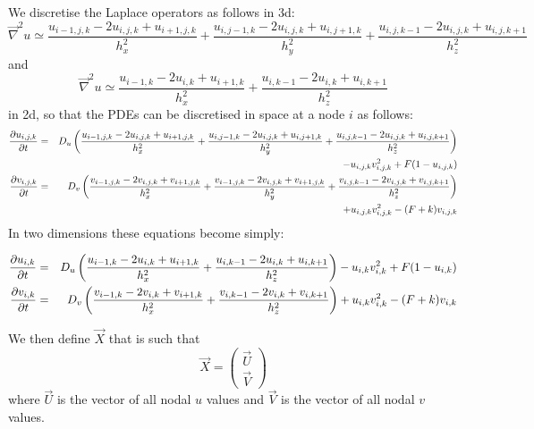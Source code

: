 We discretise the Laplace operators as follows in 3d:
\[
\vec\nabla^2 u \simeq 
\frac{u_{i-1,j,k}-2u_{i,j,k}+u_{i+1,j,k}}{h_x^2} + 
\frac{u_{i,j-1,k}-2u_{i,j,k}+u_{i,j+1,k}}{h_y^2} + 
\frac{u_{i,j,k-1}-2u_{i,j,k}+u_{i,j,k+1}}{h_z^2} 
\]
and
\[
\vec\nabla^2 u \simeq 
\frac{u_{i-1,k}-2u_{i,k}+u_{i+1,k}}{h_x^2} + 
\frac{u_{i,k-1}-2u_{i,k}+u_{i,k+1}}{h_z^2} 
\]
in 2d, so that the PDEs can be discretised in space at a node $i$ as follows:
\begin{eqnarray}
\frac{\partial u_{i,j,k}}{\partial t} 
&=& D_u 
\left(
\frac{u_{i-1,j,k}-2u_{i,j,k}+u_{i+1,j,k}}{h_x^2} + 
\frac{u_{i,j-1,k}-2u_{i,j,k}+u_{i,j+1,k}}{h_y^2} + 
\frac{u_{i,j,k-1}-2u_{i,j,k}+u_{i,j,k+1}}{h_z^2} 
\right) \nonumber\\
&&- u_{i,j,k}v_{i,j,k}^2 + F(1-u_{i,j,k}) 
\nonumber\\
\frac{\partial v_{i,j,k}}{\partial t} &=& D_v 
\left(
\frac{v_{i-1,j,k}-2v_{i,j,k}+v_{i+1,j,k}}{h_x^2} + 
\frac{v_{i-1,j,k}-2v_{i,j,k}+v_{i+1,j,k}}{h_y^2} + 
\frac{v_{i,j,k-1}-2v_{i,j,k}+v_{i,j,k+1}}{h_z^2} 
\right) \nonumber\\
&&
+ u_{i,j,k}v_{i,j,k}^2 - (F+k)v_{i,j,k}
\end{eqnarray}
In two dimensions these equations become simply:

\begin{eqnarray}
\frac{\partial u_{i,k}}{\partial t} 
&=& D_u 
\left(
\frac{u_{i-1,k}-2u_{i,k}+u_{i+1,k}}{h_x^2} + 
\frac{u_{i,k-1}-2u_{i,k}+u_{i,k+1}}{h_z^2} 
\right)
- u_{i,k}v_{i,k}^2 + F(1-u_{i,k}) 
\nonumber\\
\frac{\partial v_{i,k}}{\partial t} &=& D_v 
\left(
\frac{v_{i-1,k}-2v_{i,k}+v_{i+1,k}}{h_x^2} + 
\frac{v_{i,k-1}-2v_{i,k}+v_{i,k+1}}{h_z^2} 
\right) 
+ u_{i,k}v_{i,k}^2 - (F+k)v_{i,k}
\end{eqnarray}

We then define $\vec{X}$ that is such that 
\[
\vec{X} = 
\left(
\begin{array}{c}
\vec{U} \\ \vec{V}
\end{array}
\right)
\] 
where $\vec{U}$ is the vector of all nodal $u$ values and 
$\vec{V}$ is the vector of all nodal $v$ values.

